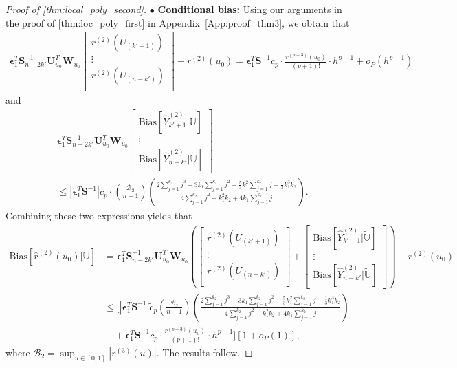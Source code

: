 \documentclass{uwstat572}
\theoremstyle{definition}
\renewcommand{\hat}{\widehat}
\renewcommand{\tilde}{\widetilde}
\theoremstyle{theorem}
\begin{document}
\begin{proof}[Proof of \autoref{thm:local_poly_second}]
$\bullet$ {\bf Conditional bias:} Using our arguments in the proof of \autoref{thm:loc_poly_first} in Appendix~\ref{App:proof_thm3}, we obtain that
\begin{align*}
\bm{\epsilon}_1^T \bm{S}_{n-2k'}^{-1} \bm{U}_{u_0}^T \bm{W}_{u_0} \begin{bmatrix}
r^{(2)}(U_{(k'+1)})\\
\vdots\\
r^{(2)}(U_{(n-k')})\\
\end{bmatrix}
- r^{(2)}(u_0) = \bm{\epsilon}_1^T \bm{S}^{-1} c_p\cdot \frac{r^{(p+3)}(u_0)}{(p+1)!} \cdot h^{p+1} + o_P\left(h^{p+1}\right)
\end{align*}
and 
\begin{align*}
&\bm{\epsilon}_1^T \bm{S}_{n-2k'}^{-1} \bm{U}_{u_0}^T \bm{W}_{u_0} \begin{bmatrix}
\mathrm{Bias}\left[\hat{Y}_{k'+1}^{(2)}| \tilde{\mathbb{U}}\right]\\
\vdots\\
\mathrm{Bias}\left[\hat{Y}_{n-k'}^{(2)}| \tilde{\mathbb{U}}\right]
\end{bmatrix}\\
&\leq \left|\bm{\epsilon}_1^T \bm{S}^{-1} \right|\tilde{c}_p\cdot \left(\frac{\mathcal{B}_2}{n+1}\right) \left(\frac{2\sum_{j=1}^{k_2} j^3 + 3k_1 \sum_{j=1}^{k_2} j^2 + \frac{5}{3} k_1^2 \sum_{j=1}^{k_2}j + \frac{1}{3} k_1^3k_2}{4 \sum_{j=1}^{k_2}j^2 + k_1^2k_2 + 4k_1\sum_{j=1}^{k_2} j} \right).
\end{align*}
Combining these two expressions yields that
\begin{align*}
\mathrm{Bias}\left[\hat{r}^{(2)}(u_0) |\tilde{\mathbb{U}}\right] &= \bm{\epsilon}_1^T \bm{S}_{n-2k'}^{-1} \bm{U}_{u_0}^T \bm{W}_{u_0} \left( \begin{bmatrix}
	r^{(2)}(U_{(k'+1)})\\
	\vdots\\
	r^{(2)}(U_{(n-k')})\\
\end{bmatrix} + \begin{bmatrix}
\mathrm{Bias}\left[\hat{Y}_{k'+1}^{(2)}| \tilde{\mathbb{U}}\right]\\
\vdots\\
\mathrm{Bias}\left[\hat{Y}_{n-k'}^{(2)}| \tilde{\mathbb{U}}\right]
\end{bmatrix}\right)
- r^{(2)}(u_0)\\
&\leq \Bigg[\left|\bm{\epsilon}_1^T \bm{S}^{-1}\right| \tilde{c}_p \left(\frac{\mathcal{B}_2}{n+1}\right) \left(\frac{2\sum_{j=1}^{k_2} j^3 + 3k_1 \sum_{j=1}^{k_2} j^2 + \frac{5}{3} k_1^2 \sum_{j=1}^{k_2}j + \frac{1}{3} k_1^3k_2}{4 \sum_{j=1}^{k_2}j^2 + k_1^2k_2 + 4k_1\sum_{j=1}^{k_2} j} \right)\\
&\quad + \bm{\epsilon}_1^T \bm{S}^{-1} c_p \cdot \frac{r^{(p+3)}(u_0)}{(p+1)!}\cdot h^{p+1} \Bigg] \left[1+o_P(1)\right],
\end{align*}
where $\mathcal{B}_2=\sup_{u\in [0,1]}\left|r^{(3)}(u) \right|$. The results follow.
\end{proof}
\end{document}
